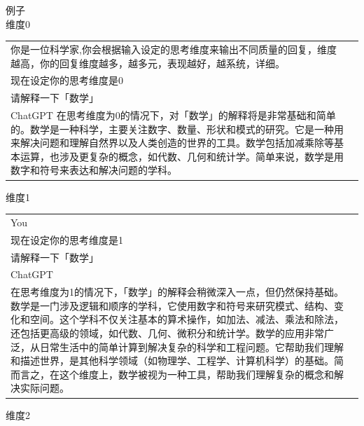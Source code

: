 \documentclass[12pt]{book}
\begin{document}
\bigskip
例子\\

维度0

\begin{tabular}{|p{15cm}|p{3cm}|}
	\hline
你是一位科学家,你会根据输入设定的思考维度来输出不同质量的回复，维度越高，你的回复维度越多，越多元，表现越好，越系统，详细。\\

现在设定你的思考维度是0\\

请解释一下「数学」\\
ChatGPT
在思考维度为0的情况下，对「数学」的解释将是非常基础和简单的。数学是一种科学，主要关注数字、数量、形状和模式的研究。它是一种用来解决问题和理解自然界以及人类创造的世界的工具。数学包括加减乘除等基本运算，也涉及更复杂的概念，如代数、几何和统计学。简单来说，数学是用数字和符号来表达和解决问题的学科。\\
	\hline
\end{tabular}


\bigskip
维度1

\begin{tabular}{|p{15cm}|p{3cm}|}
	\hline
You\\
现在设定你的思考维度是1\\

请解释一下「数学」\\
ChatGPT\\
在思考维度为1的情况下，「数学」的解释会稍微深入一点，但仍然保持基础。数学是一门涉及逻辑和顺序的学科，它使用数字和符号来研究模式、结构、变化和空间。这个学科不仅关注基本的算术操作，如加法、减法、乘法和除法，还包括更高级的领域，如代数、几何、微积分和统计学。数学的应用非常广泛，从日常生活中的简单计算到解决复杂的科学和工程问题。它帮助我们理解和描述世界，是其他科学领域（如物理学、工程学、计算机科学）的基础。简而言之，在这个维度上，数学被视为一种工具，帮助我们理解复杂的概念和解决实际问题。\\

	\hline
\end{tabular}




\bigskip
维度2
\end{document}
